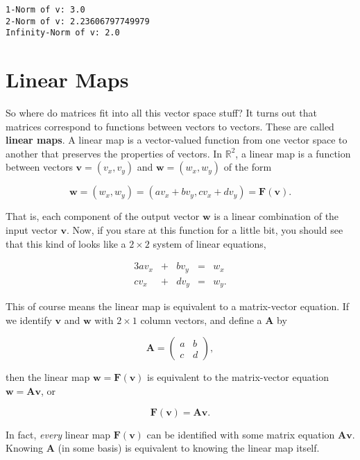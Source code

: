 \documentclass[
  letterpaper,
  DIV=11,
  numbers=noendperiod]{scrreprt}
\begin{document}
\begin{verbatim}
1-Norm of v: 3.0
2-Norm of v: 2.23606797749979
Infinity-Norm of v: 2.0
\end{verbatim}

\hypertarget{linear-maps}{%
\section{Linear Maps}\label{linear-maps}}

So where do matrices fit into all this vector space stuff? It turns out
that matrices correspond to functions between vectors to vectors. These
are called \textbf{linear maps}. A linear map is a vector-valued
function from one vector space to another that preserves the properties
of vectors. In \(\mathbb{R}^2\), a linear map is a function between
vectors \(\mathbf{v}=(v_x,v_y)\) and \(\mathbf{w}=(w_x,w_y)\) of the
form

\[\mathbf{w} = (w_x, w_y) = (av_x + bv_y, cv_x + dv_y) = \mathbf{F}(\mathbf{v}).\]

That is, each component of the output vector \(\mathbf{w}\) is a linear
combination of the input vector \(\mathbf{v}\). Now, if you stare at
this function for a little bit, you should see that this kind of looks
like a \(2 \times 2\) system of linear equations,

\begin{alignat*}{3}
   av_x & {}+{} &  bv_y & {}={} & w_x \\
   cv_x & {}+{} &  dv_y & {}={} & w_y.
\end{alignat*}

This of course means the linear map is equivalent to a matrix-vector
equation. If we identify \(\mathbf{v}\) and \(\mathbf{w}\) with
\(2 \times 1\) column vectors, and define a \(\mathbf{A}\) by

\[
\mathbf{A} = 
\begin{pmatrix}
a & b \\
c & d
\end{pmatrix},
\]

then the linear map \(\mathbf{w} = \mathbf{F}(\mathbf{v})\) is
equivalent to the matrix-vector equation
\(\mathbf{w}=\mathbf{A}\mathbf{v}\), or

\[\mathbf{F}(\mathbf{v}) = \mathbf{A}\mathbf{v}.\]

In fact, \emph{every} linear map \(\mathbf{F}(\mathbf{v})\) can be
identified with some matrix equation \(\mathbf{A}\mathbf{v}\). Knowing
\(\mathbf{A}\) (in some basis) is equivalent to knowing the linear map
itself.
\end{document}
